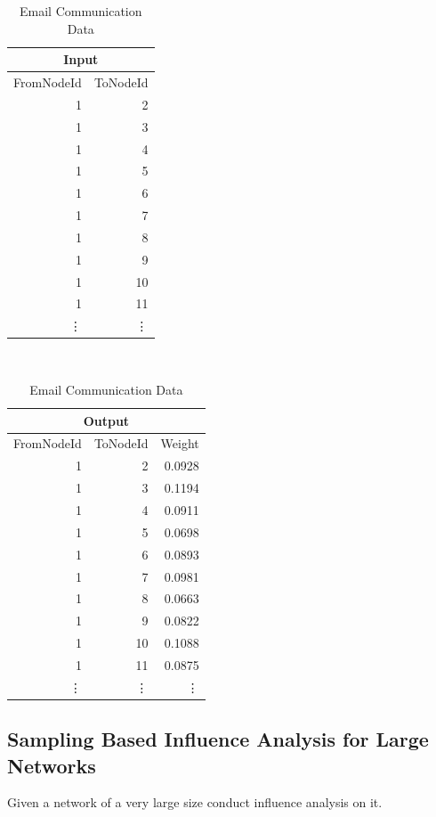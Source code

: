 \begin{table}
\centering
\begin{tabular}{rr}\\ \hline
\multicolumn{2}{c}{Input}\\ \hline
FromNodeId &     ToNodeId \\ \hline
1          &  2  \\
1          &  3  \\
1          &  4  \\
1          &  5  \\
1          &  6  \\
1          &  7  \\
1          &  8  \\
1          &  9  \\
1          &  10  \\
1          &  11  \\
\vdots & \vdots \\ \hline
\end{tabular}\\
\begin{tabular}{rrr}\\ \hline
\multicolumn{3}{c}{Output}\\ \hline
FromNodeId &     ToNodeId & Weight\\ \hline
1          &  2  & 0.0928\\
1          &  3  & 0.1194\\
1          &  4  & 0.0911\\
1          &  5  & 0.0698\\
1          &  6  & 0.0893\\
1          &  7  & 0.0981\\
1          &  8  & 0.0663\\
1          &  9  & 0.0822\\
1          &  10  & 0.1088\\
1          &  11  & 0.0875\\
\vdots & \vdots & \vdots\\ \hline
\end{tabular}
\caption{Email Communication Data}
\end{table}

\pagebreak
\subsection{Sampling Based Influence Analysis for Large Networks}

 Given a network of a very large size conduct
influence analysis on it.


